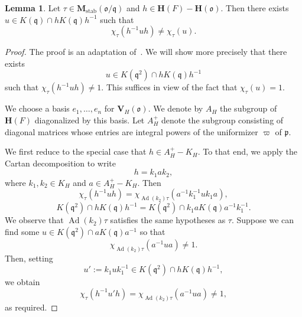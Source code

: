 \documentclass[reqno]{amsart}
\DeclareMathOperator{\Ad}{Ad}
\DeclareMathOperator{\stab}{stab}
\theoremstyle{plain} \newtheorem{theorem} {Theorem} \newtheorem{conjecture} {Conjecture} \newtheorem{corollary} [theorem] {Corollary} \newtheorem{proposition} [theorem] {Proposition} \newtheorem{fact} [theorem] {Fact}
\theoremstyle{definition} \newtheorem{definition} [theorem] {Definition}
\theoremstyle{itplain} %
\newtheorem{lemma}[theorem]{Lemma}
\newcommand{\mfq}{\mathfrak{q}}
\begin{document}
\begin{lemma}\label{lemma:let-tau-in-barm_st-h-in-mathbfhf-mathbfhm-then-the}
  Let $\tau \in \mathbf{M}_{\stab}(\mathfrak{o}/\mfq)$ and $h \in \mathbf{H}(F) - \mathbf{H}(\mathfrak{o})$.  Then there exists $u \in K(\mfq) \cap h K(\mfq) h^{-1}$ such that
  \begin{equation}\label{eqn:k1-cap-h-k1-h-1-}
    \chi_\tau(h ^{-1} u h) \neq \chi _\tau (u).
  \end{equation}
\end{lemma}
\begin{proof}
  The proof is an adaptation of~\cite[Lemma 19.7]{nelson-venkatesh-1}. We will show more precisely that there exists
  \begin{equation*}
    u \in K(\mfq^2) \cap h K(\mfq) h ^{-1}
  \end{equation*}
  such that $\chi _\tau (h ^{-1} u h) \neq 1$.  This suffices in view of the fact that $\chi_\tau(u) = 1$.

  We choose a basis $e_1,\dotsc,e_n$ for $\mathbf{V}_H(\mathfrak{o})$.  We denote by $A_H$ the subgroup of $\mathbf{H}(F)$ diagonalized by this basis.  Let $A_H^+$ denote the subgroup consisting of diagonal matrices whose entries are integral powers of the uniformizer $\varpi$ of $\mathfrak{p}$.

  We first reduce to the special case that $h \in A_H^+ - K_H$.  To that end, we apply the Cartan decomposition to write
  \begin{equation*}
    h = k_1 a k_2,
  \end{equation*}
  where $k_1, k_2 \in K_H$ and $a \in A_H^+ - K_H$.  Then
  \begin{equation*}
    \chi_\tau(h^{-1} u h) = \chi_{\Ad(k_2) \tau}(a^{-1} k_1^{-1} u k_1 a),
  \end{equation*}
  \begin{equation*}
    K(\mfq^2) \cap h K(\mfq) h^{-1}
    =
    K(\mfq^2) \cap k_1 a K(\mfq) a^{-1}k_1^{-1}.
  \end{equation*}
  We observe that $\Ad(k_2) \tau$ satisfies the same hypotheses as $\tau$.  Suppose we can find some $u \in K(\mfq^2) \cap a K(\mfq) a^{-1}$ so that
  \begin{equation*}
    \chi_{\Ad(k_2) \tau}(a^{-1} u a) \neq 1.
  \end{equation*}
  Then, setting
  \begin{equation*}
    u' := k_1 u k_1^{-1} \in K(\mfq^2) \cap h K(\mfq) h^{-1},
  \end{equation*}
  we obtain
  \begin{equation*}
    \chi_\tau(h^{-1} u' h) = \chi_{\Ad(k_2) \tau}(a^{-1} u a ) \neq 1,
  \end{equation*}
  as required.


\end{proof}
\end{document}
